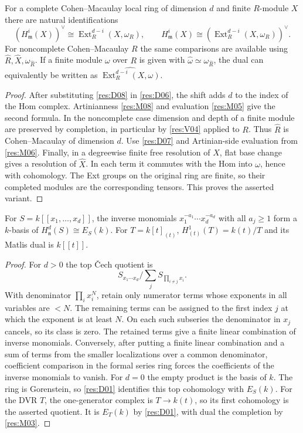 \begin{corollary}\label{res:D09}
For a complete Cohen--Macaulay local ring of dimension $d$
and finite $R$-module $X$ there are natural identifications
\[
 (H^i_{\mathfrak m}(X))^\vee
       \cong \operatorname{Ext}^{d-i}_R(X,\omega_R),\qquad
 H^i_{\mathfrak m}(X)
       \cong (\operatorname{Ext}^{d-i}_R(X,\omega_R))^\vee .
\]
For noncomplete Cohen--Macaulay $R$ the same comparisons are
available using $\widehat R,\widehat X,\omega_{\widehat R}$.
If a finite module $\omega$ over $R$ is given with
$\widehat\omega\simeq\omega_{\widehat R}$, the dual can equivalently
be written as $\widehat{\operatorname{Ext}^{d-i}_R(X,\omega)}$.
\end{corollary}
\begin{proof}
After substituting \ref{res:D08} in \ref{res:D06}, the shift adds $d$ to
the index of the Hom complex. Artinianness \ref{res:M08} and
evaluation \ref{res:M05} give the second formula. In the
noncomplete case dimension and depth of a finite module
are preserved by completion, in particular by \ref{res:V04}
applied to $R$. Thus $\widehat R$ is Cohen--Macaulay of
dimension $d$. Use \ref{res:D07} and Artinian-side evaluation
from \ref{res:M06}. Finally, in a degreewise finite free
resolution of $X$, flat base change gives a resolution of
$\widehat X$. In each term it commutes with the Hom into
$\omega$, hence with cohomology. The Ext groups on the
original ring are finite, so their completed modules are the
corresponding tensors. This proves the asserted variant.
\end{proof}

\begin{example}\label{res:E01}
For $S=k[[x_1,\ldots,x_d]]$, the inverse monomials
$x_1^{-a_1}\cdots x_d^{-a_d}$ with all $a_j\ge1$ form a $k$-basis
of $H^d_{\mathfrak n}(S)\cong E_S(k)$. For $T=k[t]_{(t)}$,
$H^1_{(t)}(T)=k(t)/T$ and its Matlis dual is $k[[t]]$.
\end{example}
\begin{proof}
For $d>0$ the top \v{C}ech quotient is
\[
 S_{x_1\cdots x_d}\bigg/\sum_j S_{\prod_{i\ne j} x_i}.
\]
With denominator $\prod_i x_i^N$, retain only numerator terms
whose exponents in all variables are $<N$. The remaining terms
can be assigned to the first index $j$ at which the exponent is
at least $N$. On each such subseries the denominator in $x_j$
cancels, so its class is zero. The retained terms give a finite
linear combination of inverse monomials. Conversely, after
putting a finite linear combination and a sum of terms from the
smaller localizations over a common denominator, coefficient
comparison in the formal series ring forces the coefficients
of the inverse monomials to vanish. For $d=0$ the empty product
is the basis of $k$. The ring is Gorenstein, so \ref{res:D01}
identifies this top cohomology with $E_S(k)$.
For the DVR $T$, the one-generator complex is
$T\to k(t)$, so its first cohomology is the asserted quotient.
It is $E_T(k)$ by \ref{res:D01}, with dual the completion by
\ref{res:M03}.
\end{proof}


